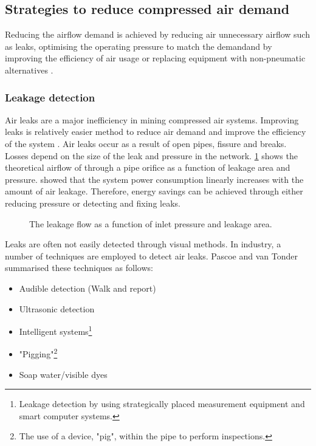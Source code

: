 	\subsection{Strategies to reduce compressed air demand}
	Reducing the airflow demand is achieved by reducing air unnecessary airflow such as leaks, optimising the operating pressure to match the demand\footnotemark[2] and by improving the efficiency of air usage or replacing equipment with non-pneumatic alternatives \cite{Snyman2011Masters}.
		 \subsubsection{Leakage detection}	 
		 Air leaks are a major inefficiency in mining compressed air systems. Improving leaks is relatively easier method to reduce air demand and improve the efficiency of the system \cite{van2011sustaining}. Air leaks occur as a result of open pipes, fissure and breaks. Losses depend on the size of the leak and pressure in the network. \cref{fig: Leak losses} shows the theoretical airflow of through a pipe orifice as a function of leakage area and pressure\footnotemark[1]. \cite{van2011sustaining} showed that the system power consumption linearly increases with the amount of air leakage. Therefore, energy savings can be achieved through either reducing pressure or detecting and fixing leaks.
		 \begin{figure}[h]
		 	\centering
		 	\fbox{\hspace{2cm}\hspace{2cm}}
		 	\caption[The leakage flow as a function of inlet pressure and leakage area]{ The leakage flow as a function of inlet pressure and leakage area\protect\footnotemark[3].}
		 	\label{fig: Leak losses}
		 \end{figure}
	 \par 
		 Leaks are often not easily detected through visual methods. In industry, a number of techniques are employed to detect air leaks. Pascoe \cite{Pascoe2016Masters} and van Tonder \cite{vanTonder2010Masters} summarised these techniques as follows:
		 \begin{itemize}
		 	\item Audible detection (Walk and report)
		 	\item Ultrasonic detection
		 	\item Intelligent systems\footnote{Leakage detection by using strategically placed measurement equipment and smart computer systems.}
		 	\item "Pigging"\footnote{The use of a device, "pig", within the pipe to perform inspections.}
		 	\item Soap water/visible dyes 
		 \end{itemize}
